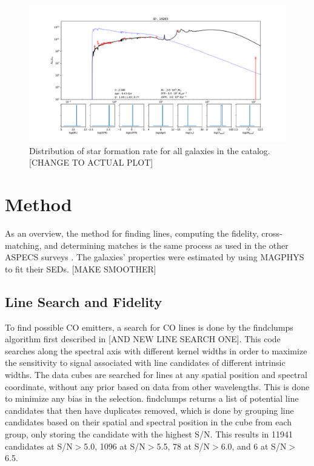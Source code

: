 \begin{figure}[tbp]
\centering \includegraphics[width=120mm]{19265.pdf}
\caption{Distribution of star formation rate for all galaxies in the catalog. [CHANGE TO ACTUAL PLOT]}
\label{fig:MAGPHYS_Properties}
\end{figure}

\section{Method}

As an overview, the method for finding lines, computing the fidelity, cross-matching, and determining matches is the same process as used in the other ASPECS surveys \cite{walter2016alma, decarli2019alma}. The galaxies' properties were estimated by using MAGPHYS to fit their SEDs. [MAKE SMOOTHER]

\subsection{Line Search and Fidelity}

To find possible CO emitters, a search for CO lines is done by the findclumps algorithm first described in \cite{walter2016alma} [AND NEW LINE SEARCH ONE]. This code searches along the spectral axis with different kernel widths in order to maximize the sensitivity to signal associated with line candidates of different intrinsic widths. The data cubes are searched for lines at any spatial position and spectral coordinate, without any prior based on data from other wavelengths. This is done to minimize any bias in the selection. findclumps returns a list of potential line candidates that then have duplicates removed, which is done by grouping line candidates based on their spatial and spectral position in the cube from each group, only storing the candidate with the highest S/N. This results in 11941 candidates at S/N$>$5.0, 1096 at S/N$>$5.5, 78 at S/N$>$6.0, and 6 at S/N$>$6.5. 

